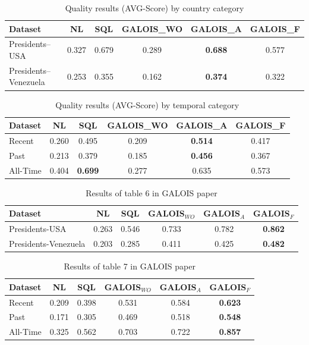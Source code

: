 \documentclass[11pt]{article}
\begin{document}
\begin{table}[htbp]
\centering
\caption{Quality results (AVG-Score) by country category}
\label{tab:exp4_country}
\begin{tabular}{lccccc}
\hline
Dataset & NL & SQL & GALOIS\_WO & GALOIS\_A & GALOIS\_F \\
\hline
Presidents--USA
& 0.327
& 0.679
& 0.289
& \textbf{0.688}
& 0.577 \\

Presidents--Venezuela
& 0.253
& 0.355
& 0.162
& \textbf{0.374}
& 0.322 \\
\hline
\end{tabular}
\end{table}

\begin{table}[htbp]
\centering
\caption{Quality results (AVG-Score) by temporal category}
\label{tab:exp4_time}
\begin{tabular}{lccccc}
\hline
Dataset & NL & SQL & GALOIS\_WO & GALOIS\_A & GALOIS\_F \\
\hline
Recent
& 0.260
& 0.495
& 0.209
& \textbf{0.514}
& 0.417 \\

Past
& 0.213
& 0.379
& 0.185
& \textbf{0.456}
& 0.367 \\

All-Time
& 0.404
& \textbf{0.699}
& 0.277
& 0.635
& 0.573 \\
\hline
\end{tabular}
\end{table}

\begin{table}[htbp]
\centering
\caption{Results of table 6 in GALOIS paper}
\label{tab:presidents_results}
\begin{tabular}{lccccc}
\hline
\textbf{Dataset} & \textbf{NL} & \textbf{SQL} & \textbf{GALOIS$_{WO}$} & \textbf{GALOIS$_A$} & \textbf{GALOIS$_F$} \\
\hline
Presidents-USA        & 0.263 & 0.546 & 0.733 & 0.782 & \textbf{0.862} \\
Presidents-Venezuela  & 0.203 & 0.285 & 0.411 & 0.425 & \textbf{0.482} \\
\hline
\end{tabular}
\end{table}

\begin{table}[H]
\centering
\caption{Results of table 7 in GALOIS paper}
\label{tab:temporal_results}
\begin{tabular}{lccccc}
\hline
\textbf{Dataset} & \textbf{NL} & \textbf{SQL} & \textbf{GALOIS$_{WO}$} & \textbf{GALOIS$_A$} & \textbf{GALOIS$_F$} \\
\hline
Recent     & 0.209 & 0.398 & 0.531 & 0.584 & \textbf{0.623} \\
Past       & 0.171 & 0.305 & 0.469 & 0.518 & \textbf{0.548} \\
All-Time   & 0.325 & 0.562 & 0.703 & 0.722 & \textbf{0.857} \\
\hline
\end{tabular}
\end{table}
\end{document}
